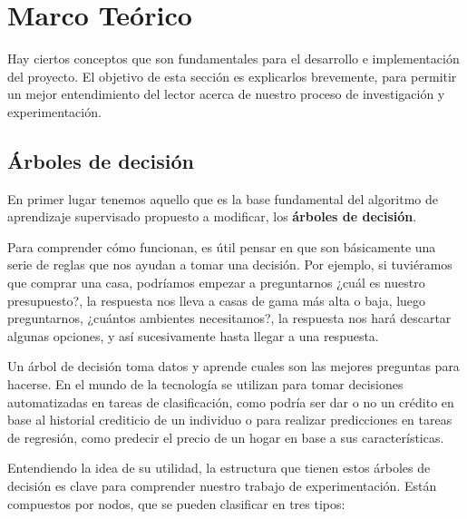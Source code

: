 %
\chapter{Marco Teórico}
\label{ch::capitulo5}

Hay ciertos conceptos que son fundamentales para el desarrollo e implementación del proyecto. El objetivo de esta sección es explicarlos brevemente, para permitir un mejor entendimiento del lector acerca de nuestro proceso de investigación y experimentación.

\section{Árboles de decisión}

En primer lugar tenemos aquello que es la base fundamental del algoritmo de aprendizaje supervisado propuesto a modificar, los \textbf{árboles de decisión}.

Para comprender cómo funcionan, es útil pensar en que son básicamente una serie de reglas que nos ayudan a tomar una decisión. Por ejemplo, si tuviéramos que comprar una casa, podríamos empezar a preguntarnos ¿cuál es nuestro presupuesto?, la respuesta nos lleva a casas de gama más alta o baja, luego preguntarnos, ¿cuántos ambientes necesitamos?, la respuesta nos hará descartar algunas opciones, y así sucesivamente hasta llegar a una respuesta.

Un árbol de decisión toma datos y aprende cuales son las mejores preguntas para hacerse. En el mundo de la tecnología se utilizan para tomar decisiones automatizadas en tareas de clasificación, como podría ser dar o no un crédito en base al historial crediticio de un individuo o para realizar predicciones en tareas de regresión, como predecir el precio de un hogar en base a sus características.

Entendiendo la idea de su utilidad, la estructura que tienen estos árboles de decisión es clave para comprender nuestro trabajo de experimentación. Están compuestos por nodos, que se pueden clasificar en tres tipos:

